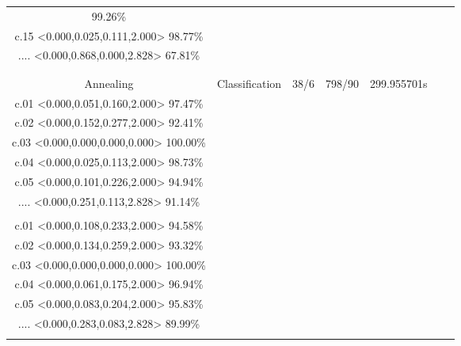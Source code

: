 \documentclass[8pt, a4paper]{article}
\begin{document}
\begin{landscape}
\begin{tabular}{|c|c|c|c|c|c|c|}
99.26\%\\c.15 <0.000,0.025,0.111,2.000> 98.77\%\\.... <0.000,0.868,0.000,2.828> 67.81\%\\} \\
\hline
\\
Annealing & Classification & 38/6 & 798/90 & 299.955701s & \makecell{c.00 <0.000,0.025,0.113,2.000> 98.73\%\\c.01 <0.000,0.051,0.160,2.000> 97.47\%\\c.02 <0.000,0.152,0.277,2.000> 92.41\%\\c.03 <0.000,0.000,0.000,0.000> 100.00\%\\c.04 <0.000,0.025,0.113,2.000> 98.73\%\\c.05 <0.000,0.101,0.226,2.000> 94.94\%\\.... <0.000,0.251,0.113,2.828> 91.14\%\\} & \makecell{c.00 <0.000,0.014,0.083,2.000> 99.30\%\\c.01 <0.000,0.108,0.233,2.000> 94.58\%\\c.02 <0.000,0.134,0.259,2.000> 93.32\%\\c.03 <0.000,0.000,0.000,0.000> 100.00\%\\c.04 <0.000,0.061,0.175,2.000> 96.94\%\\c.05 <0.000,0.083,0.204,2.000> 95.83\%\\.... <0.000,0.283,0.083,2.828> 89.99\%\\} \\
\hline
\end{tabular}\newpage
\end{landscape}
\end{document}
